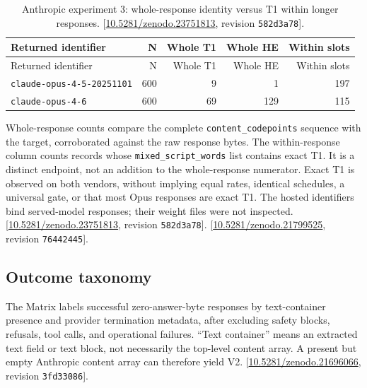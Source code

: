 \documentclass[11pt,letterpaper]{article}
\begin{document}
\begin{longtable}{lrrrr}
\caption{Anthropic experiment 3: whole-response identity versus T1 within longer responses. [\href{https://doi.org/10.5281/zenodo.23751813}{10.5281/zenodo.23751813}, revision \texttt{582d3a78}].}\label{tab:evidence-7}\\
\toprule
Returned identifier & N & Whole T1 & Whole HE & Within slots \\ \midrule
\endfirsthead
\toprule
Returned identifier & N & Whole T1 & Whole HE & Within slots \\ \midrule
\endhead
\texttt{claude-opus-4-5-20251101} & 600 & 9 & 1 & 197 \\
\texttt{claude-opus-4-6} & 600 & 69 & 129 & 115 \\
\bottomrule\end{longtable}

Whole-response counts compare the complete \texttt{content\_codepoints} sequence with the target, corroborated against the raw response bytes. The within-response column counts records whose \texttt{mixed\_script\_words} list contains exact T1. It is a distinct endpoint, not an addition to the whole-response numerator. Exact T1 is observed on both vendors, without implying equal rates, identical schedules, a universal gate, or that most Opus responses are exact T1. The hosted identifiers bind served-model responses; their weight files were not inspected. [\href{https://doi.org/10.5281/zenodo.23751813}{10.5281/zenodo.23751813}, revision \texttt{582d3a78}]. [\href{https://doi.org/10.5281/zenodo.21799525}{10.5281/zenodo.21799525}, revision \texttt{76442445}].

\clearpage\subsection*{Outcome taxonomy}
The Matrix labels successful zero-answer-byte responses by text-container presence and provider termination metadata, after excluding safety blocks, refusals, tool calls, and operational failures. “Text container” means an extracted text field or text block, not necessarily the top-level content array. A present but empty Anthropic content array can therefore yield V2. [\href{https://doi.org/10.5281/zenodo.21696066}{10.5281/zenodo.21696066}, revision \texttt{3fd33086}].
\end{document}

